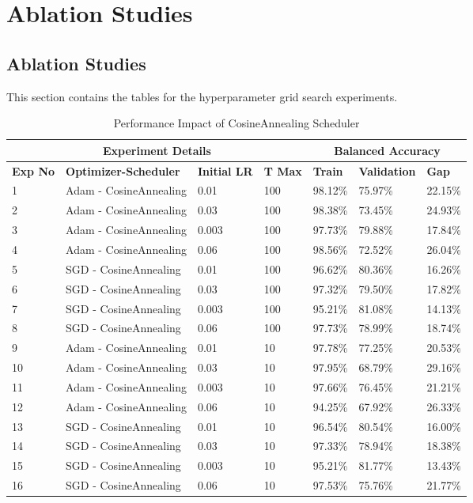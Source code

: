 \chapter{Ablation Studies}

\section{Ablation Studies}
This section contains the tables for the hyperparameter grid search experiments.
\begin{table}[t]
\caption{Performance Impact of CosineAnnealing Scheduler}
\label{table:cosineannealing-tmax}
\begin{center}
\small
\begin{tabular}{lllllll}
\multicolumn{4}{c}{\bf{Experiment Details}} & \multicolumn{3}{c}{\bf{Balanced Accuracy}} \\
\hline
\bf{Exp No} & \bf{Optimizer-Scheduler} & \bf{Initial LR} & \bf{T Max} & \bf{Train} & \bf{Validation} & \bf{Gap} \\
\hline
1 & Adam - CosineAnnealing & 0.01 & 100 & 98.12\% & 75.97\% & 22.15\% \\
2 & Adam - CosineAnnealing & 0.03 & 100 & 98.38\% & 73.45\% & 24.93\% \\
3 & Adam - CosineAnnealing & 0.003 & 100 & 97.73\% & 79.88\% & 17.84\% \\
4 & Adam - CosineAnnealing & 0.06 & 100 & 98.56\% & 72.52\% & 26.04\% \\
5 & SGD - CosineAnnealing & 0.01 & 100 & 96.62\% & 80.36\% & 16.26\% \\
6 & SGD - CosineAnnealing & 0.03 & 100 & 97.32\% & 79.50\% & 17.82\% \\
7 & SGD - CosineAnnealing & 0.003 & 100 & 95.21\% & 81.08\% & 14.13\% \\
8 & SGD - CosineAnnealing & 0.06 & 100 & 97.73\% & 78.99\% & 18.74\% \\
9 & Adam - CosineAnnealing & 0.01 & 10 & 97.78\% & 77.25\% & 20.53\% \\
10 & Adam - CosineAnnealing & 0.03 & 10 & 97.95\% & 68.79\% & 29.16\% \\
11 & Adam - CosineAnnealing & 0.003 & 10 & 97.66\% & 76.45\% & 21.21\% \\
12 & Adam - CosineAnnealing & 0.06 & 10 & 94.25\% & 67.92\% & 26.33\% \\
13 & SGD - CosineAnnealing & 0.01 & 10 & 96.54\% & 80.54\% & 16.00\% \\
14 & SGD - CosineAnnealing & 0.03 & 10 & 97.33\% & 78.94\% & 18.38\% \\
15 & SGD - CosineAnnealing & 0.003 & 10 & 95.21\% & 81.77\% & 13.43\% \\
16 & SGD - CosineAnnealing & 0.06 & 10 & 97.53\% & 75.76\% & 21.77\% \\
\hline
\end{tabular}
\end{center}
\end{table}
